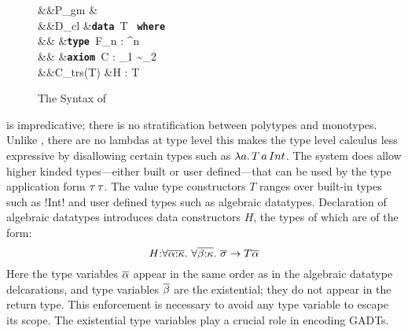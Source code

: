\documentclass[manuscript,screen,nonacm]{acmart}
\begin{document}
\begin{figure}[ht]
  \begin{syntax}
     &&P_{gm} &\bnfeq {} \mathrel{;} \many{\Tm}\\
     &&D_{cl} &\bnfeq \textbf{\texttt{data }}\App T\co\many{\kappa} \to \star\App \textbf{\texttt{ where }}\App {} \\
                             &&       &\bnfor \textbf{\texttt{type }}\App F_n : \many\kappa^n \to \kappa\\
                             &&       &\bnfor  \textbf{\texttt{axiom }}\App C\App \many{\alpha\co\kappa} : \sigma_1 \sim \sigma_2\\
     &&C_{trs}(T) &\bnfeq H : \Forall {\many{\alpha\co\kappa}} { \many{(\tau \sim \tau)} \then \many\sigma \to T\many\alpha}\\
  \end{syntax}
  
  \caption{The Syntax of \SFC}
  \label{fig:system-fc-syntax}
\end{figure}

\SFC is impredicative; there is no stratification between polytypes and monotypes. Unlike \SFw, there are no lambdas at type level this makes the type level calculus less expressive by disallowing certain types such as $\lambda a.\, T\, a\, Int$. The system does allow higher kinded types---either built or user defined---that can be used by the type application form $\tau\,\tau$.  The value type constructors $T$ ranges over built-in types such as !Int! and user defined types such as algebraic datatypes. Declaration of algebraic datatypes introduces data constructors $H$, the types of which are of the form:
$$
H {:} \forall\overline{\alpha{:}\kappa}.~\forall\overline{\beta{:}\kappa}.~\overline{\sigma} \to T \overline{\alpha}
$$
Here the type variables $\overline{\alpha}$ appear in the same order as in the algebraic datatype delcarations,  and type variables $\overline{\beta}$ are the existential; they do not appear in the return type. This enforcement is necessary to avoid any type variable to escape its scope. The existential type variables play a crucial role in encoding GADTs. 
\end{document}
